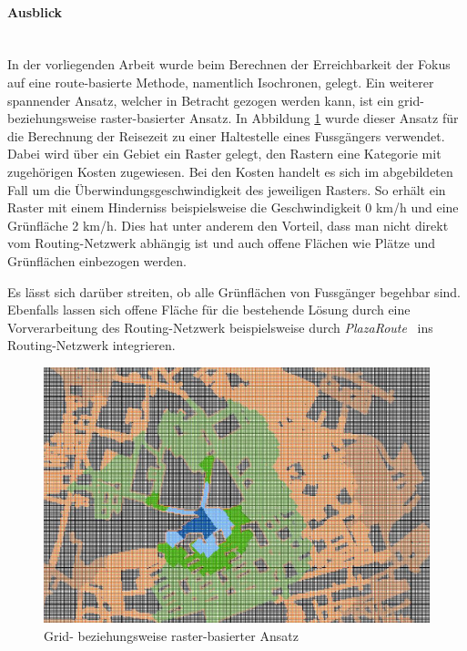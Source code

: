 \paragraph{Ausblick}~\\
In der vorliegenden Arbeit wurde beim Berechnen der Erreichbarkeit der Fokus auf eine route-basierte Methode, namentlich Isochronen, gelegt.
Ein weiterer spannender Ansatz, welcher in Betracht gezogen werden kann, ist ein grid- beziehungsweise raster-basierter Ansatz.
In Abbildung \ref{fig:mgmt_summary_grid_based_approach} wurde dieser Ansatz für die Berechnung der Reisezeit zu einer Haltestelle eines Fussgängers verwendet.
Dabei wird über ein Gebiet ein Raster gelegt, den Rastern eine Kategorie mit zugehörigen Kosten zugewiesen.
Bei den Kosten handelt es sich im abgebildeten Fall um die Überwindungsgeschwindigkeit des jeweiligen Rasters.
So erhält ein Raster mit einem Hinderniss beispielsweise die Geschwindigkeit 0 km/h und eine Grünfläche 2 km/h.
Dies hat unter anderem den Vorteil, dass man nicht direkt vom Routing-Netzwerk abhängig ist und auch offene Flächen wie Plätze und Grünflächen einbezogen werden.

Es lässt sich darüber streiten, ob alle Grünflächen von Fussgänger begehbar sind.
Ebenfalls lassen sich offene Fläche für die bestehende Lösung durch eine Vorverarbeitung des Routing-Netzwerk beispielsweise durch \emph{PlazaRoute}~\cite{plaza_route} ins Routing-Netzwerk integrieren.

\begin{figure}[ht]
    \centering
    \includegraphics[width=0.6\linewidth]{start/img/grid_based_approach.png}
    \caption[Grid- beziehungsweise raster-basierter Ansatz]{Grid- beziehungsweise raster-basierter Ansatz~\cite{pedestrian_accessibility_planning}}
    \label{fig:mgmt_summary_grid_based_approach}
\end{figure}
